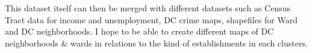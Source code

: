 \documentclass[12pt]{article}
\begin{document}
This dataset itself can then be merged with different datasets such as Census Tract data for income and unemployment, DC crime maps, shapefiles for Ward and DC neighborhoods. I hope to be able to create different maps of DC neighborhoods \& wards in relations to the kind of establishments in each clusters.
\end{document}

